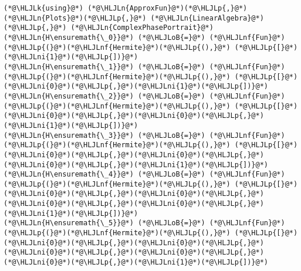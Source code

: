 \documentclass[12pt,landscape]{article}
\newcommand{\HLJLk}[1]{\textcolor[RGB]{148,91,176}{\textbf{#1}}}
\newcommand{\HLJLn}[1]{#1}
\newcommand{\HLJLnf}[1]{\textcolor[RGB]{66,102,213}{#1}}
\newcommand{\HLJLni}[1]{\textcolor[RGB]{59,151,46}{#1}}
\newcommand{\HLJLoB}[1]{\textcolor[RGB]{102,102,102}{\textbf{#1}}}
\newcommand{\HLJLp}[1]{#1}
\begin{document}
{\begin{lstlisting}
(*@\HLJLk{using}@*) (*@\HLJLn{ApproxFun}@*)(*@\HLJLp{,}@*) (*@\HLJLn{Plots}@*)(*@\HLJLp{,}@*) (*@\HLJLn{LinearAlgebra}@*)(*@\HLJLp{,}@*) (*@\HLJLn{ComplexPhasePortrait}@*)
(*@\HLJLn{H\ensuremath{\_0}}@*) (*@\HLJLoB{=}@*) (*@\HLJLnf{Fun}@*)(*@\HLJLp{(}@*)(*@\HLJLnf{Hermite}@*)(*@\HLJLp{(),}@*) (*@\HLJLp{[}@*)(*@\HLJLni{1}@*)(*@\HLJLp{])}@*)
(*@\HLJLn{H\ensuremath{\_1}}@*) (*@\HLJLoB{=}@*) (*@\HLJLnf{Fun}@*)(*@\HLJLp{(}@*)(*@\HLJLnf{Hermite}@*)(*@\HLJLp{(),}@*) (*@\HLJLp{[}@*)(*@\HLJLni{0}@*)(*@\HLJLp{,}@*)(*@\HLJLni{1}@*)(*@\HLJLp{])}@*)
(*@\HLJLn{H\ensuremath{\_2}}@*) (*@\HLJLoB{=}@*) (*@\HLJLnf{Fun}@*)(*@\HLJLp{(}@*)(*@\HLJLnf{Hermite}@*)(*@\HLJLp{(),}@*) (*@\HLJLp{[}@*)(*@\HLJLni{0}@*)(*@\HLJLp{,}@*)(*@\HLJLni{0}@*)(*@\HLJLp{,}@*)(*@\HLJLni{1}@*)(*@\HLJLp{])}@*)
(*@\HLJLn{H\ensuremath{\_3}}@*) (*@\HLJLoB{=}@*) (*@\HLJLnf{Fun}@*)(*@\HLJLp{(}@*)(*@\HLJLnf{Hermite}@*)(*@\HLJLp{(),}@*) (*@\HLJLp{[}@*)(*@\HLJLni{0}@*)(*@\HLJLp{,}@*)(*@\HLJLni{0}@*)(*@\HLJLp{,}@*)(*@\HLJLni{0}@*)(*@\HLJLp{,}@*)(*@\HLJLni{1}@*)(*@\HLJLp{])}@*)
(*@\HLJLn{H\ensuremath{\_4}}@*) (*@\HLJLoB{=}@*) (*@\HLJLnf{Fun}@*)(*@\HLJLp{(}@*)(*@\HLJLnf{Hermite}@*)(*@\HLJLp{(),}@*) (*@\HLJLp{[}@*)(*@\HLJLni{0}@*)(*@\HLJLp{,}@*)(*@\HLJLni{0}@*)(*@\HLJLp{,}@*)(*@\HLJLni{0}@*)(*@\HLJLp{,}@*)(*@\HLJLni{0}@*)(*@\HLJLp{,}@*)(*@\HLJLni{1}@*)(*@\HLJLp{])}@*)
(*@\HLJLn{H\ensuremath{\_5}}@*) (*@\HLJLoB{=}@*) (*@\HLJLnf{Fun}@*)(*@\HLJLp{(}@*)(*@\HLJLnf{Hermite}@*)(*@\HLJLp{(),}@*) (*@\HLJLp{[}@*)(*@\HLJLni{0}@*)(*@\HLJLp{,}@*)(*@\HLJLni{0}@*)(*@\HLJLp{,}@*)(*@\HLJLni{0}@*)(*@\HLJLp{,}@*)(*@\HLJLni{0}@*)(*@\HLJLp{,}@*)(*@\HLJLni{0}@*)(*@\HLJLp{,}@*)(*@\HLJLni{1}@*)(*@\HLJLp{])}@*)


\end{lstlisting}}
\end{document}
